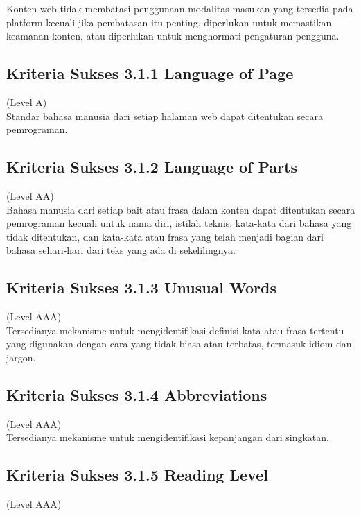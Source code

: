 Konten web tidak membatasi penggunaan modalitas masukan yang tersedia pada platform kecuali jika pembatasan itu penting, diperlukan untuk memastikan keamanan konten, atau diperlukan untuk menghormati pengaturan pengguna.

\subsection{Kriteria Sukses 3.1.1 Language of Page}
\label{subsec:kriteria_3.1.1}
(Level A) \\

Standar bahasa manusia dari setiap halaman web dapat ditentukan secara pemrograman.

\subsection{Kriteria Sukses 3.1.2 Language of Parts}
\label{subsec:kriteria_3.1.2}
(Level AA) \\

Bahasa manusia dari setiap bait atau frasa dalam konten dapat ditentukan secara pemrograman kecuali untuk nama diri, istilah teknis, kata-kata dari bahasa yang tidak ditentukan, dan kata-kata atau frasa yang telah menjadi bagian dari bahasa sehari-hari dari teks yang ada di sekelilingnya.

\subsection{Kriteria Sukses 3.1.3 Unusual Words}
\label{subsec:kriteria_3.1.3}
(Level AAA) \\

Tersedianya mekanisme untuk mengidentifikasi definisi kata atau frasa tertentu yang digunakan dengan cara yang tidak biasa atau terbatas, termasuk idiom dan jargon.

\subsection{Kriteria Sukses 3.1.4 Abbreviations}
\label{subsec:kriteria_3.1.4}
(Level AAA) \\

Tersedianya mekanisme untuk mengidentifikasi kepanjangan dari singkatan.

\subsection{Kriteria Sukses 3.1.5 Reading Level}
\label{subsec:kriteria_3.1.5}
(Level AAA) \\


